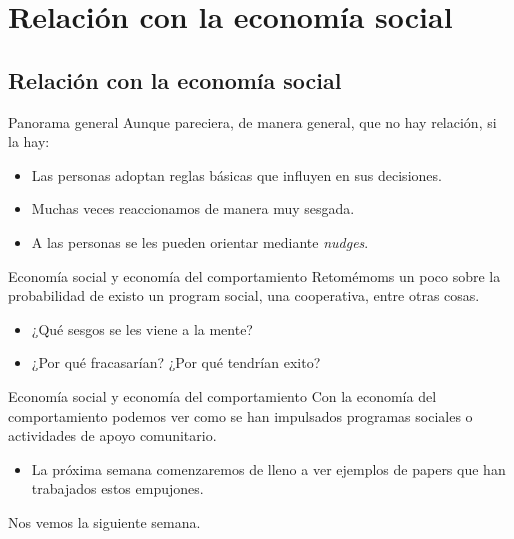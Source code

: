 \documentclass[11pt, aspectratio=169, compress]{beamer}
\makeatletter
\def\beamer@writeslidentry@miniframesoff{%
	\expandafter\beamer@ifempty\expandafter{\beamer@framestartpage}{}%
	{%
		\clearpage\beamer@notesactions%
	}
}
\newcommand*{\miniframesoff}{\let\beamer@writeslidentry=\beamer@writeslidentry@miniframesoff}
\makeatother
\begin{document}
\section{Relación con la economía social}
\subsection{Relación con la economía social}
\begin{frame}{Panorama general}
	Aunque pareciera, de manera general, que no hay relación, si la hay: 
	\begin{itemize}
		\item Las personas adoptan reglas básicas que influyen en sus decisiones. 
		\item Muchas veces reaccionamos de manera muy sesgada. 
		\item A las personas se les pueden orientar mediante \textit{nudges}.
	\end{itemize}
\end{frame}
\begin{frame}{Economía social y economía del comportamiento}
	Retomémoms un poco sobre la probabilidad de existo un program social, una cooperativa, entre otras cosas. 
	\begin{itemize}
		\item ¿Qué sesgos se les viene a la mente? 
		\item ¿Por qué fracasarían? ¿Por qué tendrían exito? 
	\end{itemize}
\end{frame}
\begin{frame}{Economía social y economía del comportamiento}
Con la economía del comportamiento podemos ver como se han impulsados programas sociales o actividades de apoyo comunitario. 
\begin{itemize}
	\item La próxima semana comenzaremos de lleno a ver ejemplos de papers que han trabajados estos empujones.
\end{itemize}
\end{frame} 

\miniframesoff 	
\begin{frame}
Nos vemos la siguiente semana. 
\end{frame}
\end{document}

